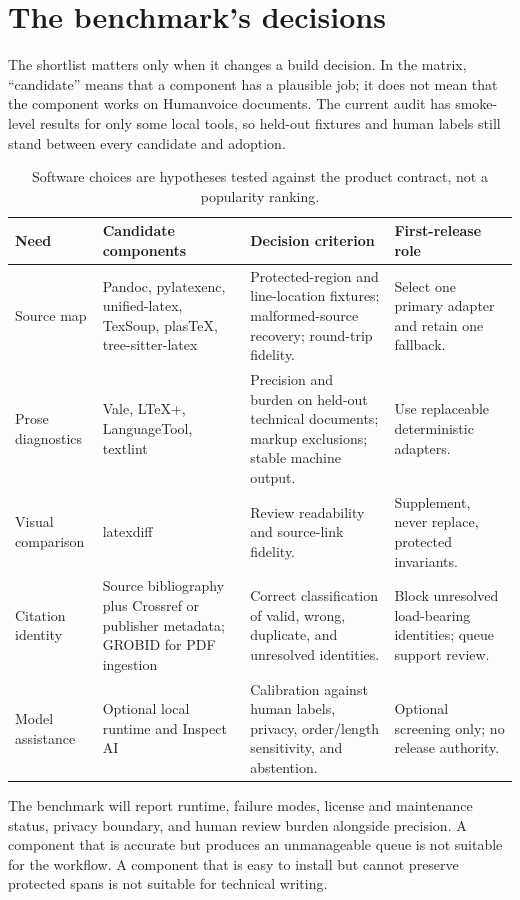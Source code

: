 \section{The benchmark's decisions}

The shortlist matters only when it changes a build decision. In the matrix,
``candidate'' means that a component has a plausible job; it does not mean that
the component works on Humanvoice documents. The current audit has smoke-level
results for only some local tools, so held-out fixtures and human labels still
stand between every candidate and adoption.

\begin{table}[H]
\centering
\small
\begin{tabularx}{\textwidth}{@{}p{}p{}L p{0.22\textwidth}@{}}
\toprule
Need & Candidate components & Decision criterion & First-release role \\
\midrule
Source map & Pandoc, pylatexenc, unified-latex, TexSoup, plasTeX,
tree-sitter-latex & Protected-region
and line-location fixtures; malformed-source recovery; round-trip fidelity. &
Select one primary adapter and retain one fallback. \\
Prose diagnostics & Vale, LTeX+, LanguageTool, textlint & Precision and burden
on held-out technical documents; markup exclusions; stable machine output. &
Use replaceable deterministic adapters. \\
Visual comparison & latexdiff & Review readability and source-link fidelity. &
Supplement, never replace, protected invariants. \\
Citation identity & Source bibliography plus Crossref or publisher metadata;
GROBID for PDF ingestion & Correct classification of valid, wrong, duplicate,
and unresolved identities. & Block unresolved load-bearing identities; queue
support review. \\
Model assistance & Optional local runtime and Inspect AI & Calibration against
human labels, privacy, order/length sensitivity, and abstention. & Optional
screening only; no release authority. \\
\bottomrule
\end{tabularx}
\caption{Software choices are hypotheses tested against the product contract,
not a popularity ranking.}
\label{tab:software-shortlist}
\end{table}

The benchmark will report runtime, failure modes, license and maintenance
status, privacy boundary, and human review burden alongside precision. A
component that is accurate but produces an unmanageable queue is not suitable
for the workflow. A component that is easy to install but cannot preserve
protected spans is not suitable for technical writing.

